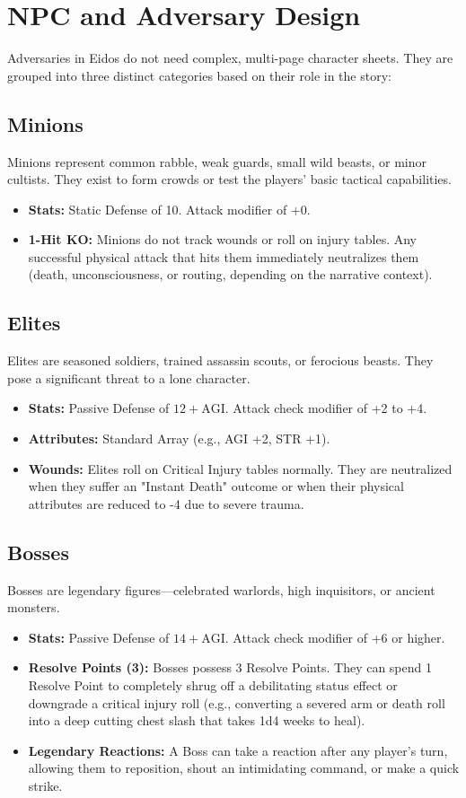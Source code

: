 \section{NPC and Adversary Design}

Adversaries in Eidos do not need complex, multi-page character sheets. They are grouped into three distinct categories based on their role in the story:

\subsection{Minions}
Minions represent common rabble, weak guards, small wild beasts, or minor cultists. They exist to form crowds or test the players' basic tactical capabilities.
\begin{itemize}
    \item \textbf{Stats:} Static Defense of 10. Attack modifier of +0.
    \item \textbf{1-Hit KO:} Minions do not track wounds or roll on injury tables. Any successful physical attack that hits them immediately neutralizes them (death, unconsciousness, or routing, depending on the narrative context).
\end{itemize}

\subsection{Elites}
Elites are seasoned soldiers, trained assassin scouts, or ferocious beasts. They pose a significant threat to a lone character.
\begin{itemize}
    \item \textbf{Stats:} Passive Defense of $12 + \text{AGI}$. Attack check modifier of +2 to +4. 
    \item \textbf{Attributes:} Standard Array (e.g., AGI +2, STR +1).
    \item \textbf{Wounds:} Elites roll on Critical Injury tables normally. They are neutralized when they suffer an "Instant Death" outcome or when their physical attributes are reduced to -4 due to severe trauma.
\end{itemize}

\subsection{Bosses}
Bosses are legendary figures—celebrated warlords, high inquisitors, or ancient monsters. 
\begin{itemize}
    \item \textbf{Stats:} Passive Defense of $14 + \text{AGI}$. Attack check modifier of +6 or higher.
    \item \textbf{Resolve Points (3):} Bosses possess 3 Resolve Points. They can spend 1 Resolve Point to completely shrug off a debilitating status effect or downgrade a critical injury roll (e.g., converting a severed arm or death roll into a deep cutting chest slash that takes 1d4 weeks to heal).
    \item \textbf{Legendary Reactions:} A Boss can take a reaction after any player's turn, allowing them to reposition, shout an intimidating command, or make a quick strike.
\end{itemize}

